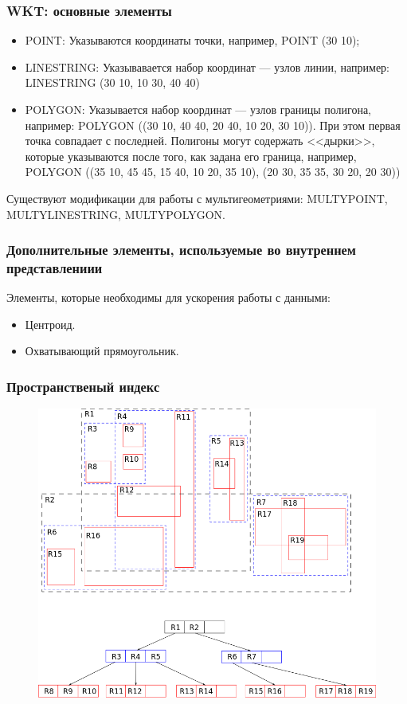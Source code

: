 \begin{frame}[fragile]
    \frametitle{WKT: основные элементы}
    \begin{itemize}
        \item POINT: Указываются координаты точки, например, POINT (30 10);
        \item LINESTRING: Указывавается набор координат --- узлов линии, например: LINESTRING (30 10, 10 30, 40 40)
        \item POLYGON: Указывается набор
        координат --- узлов границы
        полигона, например: POLYGON ((30 10, 40 40, 20
        40, 10 20, 30 10)). При этом первая точка
        совпадает с последней. Полигоны могут содержать <<дырки>>, которые указываются после того, как задана
        его граница, например,
        POLYGON ((35 10, 45 45, 15 40, 10 20, 35 10), (20 30, 35 35, 30 20, 20 30))
    \end{itemize}

    Существуют модификации для работы с мультигеометриями: MULTYPOINT, MULTYLINESTRING, MULTYPOLYGON.
\end{frame}

\begin{frame}
    \frametitle{Дополнительные элементы, используемые во внутреннем представлениии}
    Элементы, которые необходимы для ускорения работы с данными:
    \begin{itemize}
        \item Центроид.
        \item Охватывающий прямоугольник.
    \end{itemize}
\end{frame}


\begin{frame}
    \frametitle{Пространственый индекс}
    \begin{figure}[!ht]
        \begin{center}
            \includegraphics[width=0.8\columnwidth]{./vector_data/img/Rtree}
        \end{center}
    \end{figure}
\end{frame}



